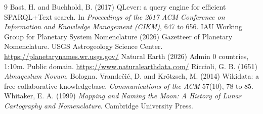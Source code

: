 \documentclass[11pt,a4paper]{article}
\begin{document}
\begin{thebibliography}{9}
 Bast, H. and Buchhold, B. (2017) QLever: a query engine for efficient SPARQL+Text search. In \textit{Proceedings of the 2017 ACM Conference on Information and Knowledge Management (CIKM)}, 647 to 656.
 IAU Working Group for Planetary System Nomenclature (2026) Gazetteer of Planetary Nomenclature. USGS Astrogeology Science Center. \url{https://planetarynames.wr.usgs.gov/}
 Natural Earth (2026) Admin 0 countries, 1:10m. Public domain. \url{https://www.naturalearthdata.com/}
 Riccioli, G. B. (1651) \textit{Almagestum Novum}. Bologna.
 Vrande\v{c}i\'c, D. and Kr\"otzsch, M. (2014) Wikidata: a free collaborative knowledgebase. \textit{Communications of the ACM} 57(10), 78 to 85.
 Whitaker, E. A. (1999) \textit{Mapping and Naming the Moon: A History of Lunar Cartography and Nomenclature}. Cambridge University Press.
\end{thebibliography}
\end{document}
